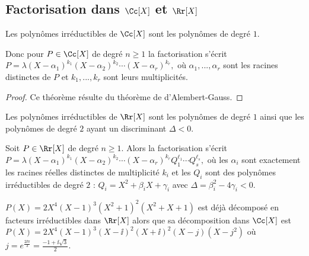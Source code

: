 \documentclass[class=report,crop=false]{standalone}
\begin{document}
\subsection{Factorisation dans $\Cc[X]$ et $\Rr[X]$}



\begin{theoreme}
Les polynômes irréductibles de $\Cc[X]$ sont les polynômes de degré $1$.

Donc pour $P\in\Cc[X]$ de degré $n\ge1$ la factorisation s'écrit
$P=\lambda (X-\alpha_1)^{k_1}(X- \alpha_2)^{k_2}\cdots(X- \alpha_r)^{k_r},$
où $\alpha_1,...,\alpha_r$ sont les racines distinctes de $P$ et
$k_1,...,k_r$ sont leurs multiplicités.
\end{theoreme}

\begin{proof}
Ce théorème résulte du théorème de d'Alembert-Gauss.
\end{proof}




\begin{theoreme}
Les polynômes irréductibles de $\Rr[X]$
sont les polynômes de degré $1$ ainsi que les polynômes de degré $2$ ayant
un discriminant $\Delta<0$.

Soit $P\in\Rr[X]$ de degré $n\ge1$. Alors
la factorisation s'écrit
$P=\lambda(X-\alpha_1)^{k_1}(X-\alpha_2)^{k_2}\cdots(X-\alpha_r)^{k_r}
Q_1^{\ell_1}\cdots Q_s^{\ell_s},$
où  les $\alpha_i$ sont exactement les racines réelles distinctes
de multiplicité $k_i$ et les $Q_i$ sont des polynômes irréductibles de degré $2$ :
$Q_i=X^2+\beta_iX+\gamma_i$ avec $\Delta = \beta_i^2-4\gamma_i<0$.
\end{theoreme}

\begin{exemple}
$P(X)=2X^4(X-1)^3(X^2+1)^2(X^2+X+1)$ est déjà décomposé en facteurs irréductibles dans $\Rr[X]$
alors que sa décomposition dans $\Cc[X]$
est $P(X)=2X^4(X-1)^3(X-\ii)^2(X+\ii)^2(X-j)(X-j^2)$
où $j=e^{\frac{2\ii\pi}{3}}=\frac{-1+\ii\sqrt3}{2}$.
\end{exemple}
\end{document}
